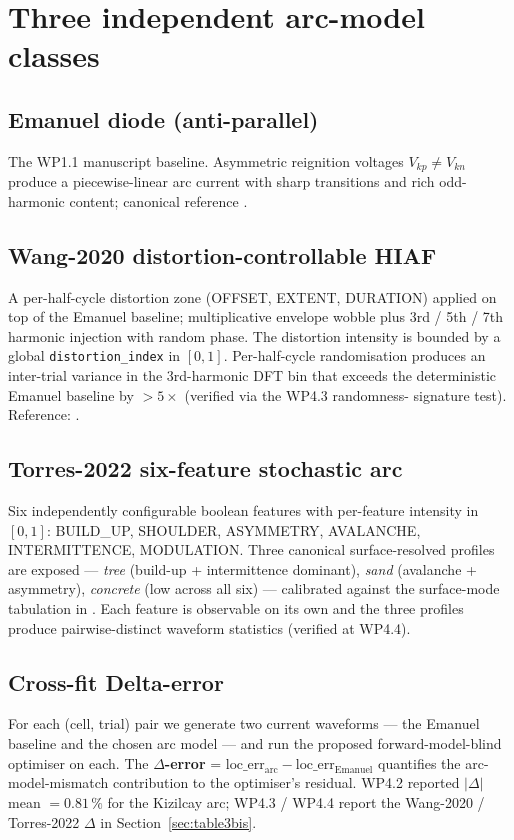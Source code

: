 \documentclass[journal]{IEEEtran}
\begin{document}
\section{Three independent arc-model classes}\label{sec:arcs}

\subsection{Emanuel diode (anti-parallel)}
The WP1.1 manuscript baseline.  Asymmetric reignition voltages
$V_{kp} \neq V_{kn}$ produce a piecewise-linear arc current with
sharp transitions and rich odd-harmonic content; canonical reference
\cite{AucoinRussell1987TPWRD}.

\subsection{Wang-2020 distortion-controllable HIAF}
A per-half-cycle distortion zone (OFFSET, EXTENT, DURATION) applied
on top of the Emanuel baseline; multiplicative envelope wobble plus
3rd / 5th / 7th harmonic injection with random phase.  The
distortion intensity is bounded by a global \texttt{distortion\_index}
in $[0, 1]$.  Per-half-cycle randomisation produces an inter-trial
variance in the 3rd-harmonic DFT bin that exceeds the deterministic
Emanuel baseline by $> 5\times$ (verified via the WP4.3 randomness-
signature test).  Reference: \cite{Wang2020TPWRD}.

\subsection{Torres-2022 six-feature stochastic arc}
Six independently configurable boolean features with per-feature
intensity in $[0, 1]$: BUILD\_UP, SHOULDER, ASYMMETRY, AVALANCHE,
INTERMITTENCE, MODULATION.  Three canonical surface-resolved
profiles are exposed --- \emph{tree} (build-up + intermittence
dominant), \emph{sand} (avalanche + asymmetry), \emph{concrete}
(low across all six) --- calibrated against the surface-mode
tabulation in \cite{Santos2022EPSR}.  Each feature is observable
on its own and the three profiles produce pairwise-distinct
waveform statistics (verified at WP4.4).

\subsection{Cross-fit Delta-error}
For each (cell, trial) pair we generate two current waveforms ---
the Emanuel baseline and the chosen arc model --- and run the
proposed forward-model-blind optimiser on each.  The
\textbf{$\Delta$-error} = $\mathrm{loc\_err}_\mathrm{arc} -
\mathrm{loc\_err}_\mathrm{Emanuel}$ quantifies the arc-model-mismatch
contribution to the optimiser's residual.  WP4.2 reported
$|\Delta|$ mean $= 0.81\,\%$ for the Kizilcay arc; WP4.3 / WP4.4
report the Wang-2020 / Torres-2022 $\Delta$ in
Section~\ref{sec:table3bis}.
\end{document}
